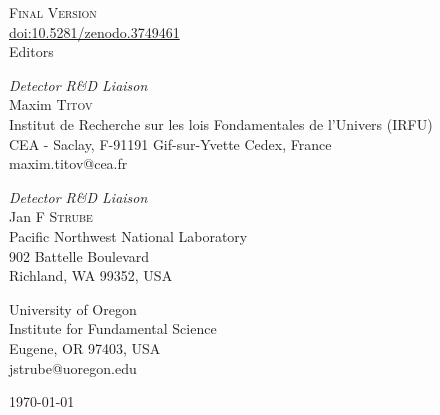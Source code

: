 \documentclass[10pt,final]{report}
\begin{document}
\begin{titlepage}
    \textsc{\Large Final Version}\\[0.5cm] %
	\href{https://doi.org/10.5281/zenodo.3749461}{doi:10.5281/zenodo.3749461}\\[1cm]
	\vfill\vfill
	{\large Editors\\}
	\begin{minipage}[t]{0.49\textwidth}
		\begin{flushleft}
			\large
			\textit{Detector R\&D Liaison}\\
			Maxim \textsc{Titov} \\
			Institut de Recherche sur les lois Fondamentales de l'Univers (IRFU) \\
			CEA - Saclay, F-91191 Gif-sur-Yvette Cedex, France\\
			maxim.titov@cea.fr
		\end{flushleft}
	\end{minipage}\hfill
	\begin{minipage}[t]{0.49\textwidth}
		\begin{flushright}
			\large
			\textit{Detector R\&D Liaison}\\
			Jan F \textsc{Strube} \\
			Pacific Northwest National Laboratory \\
			902 Battelle Boulevard \\
			Richland, WA 99352, USA \\
		\end{flushright}
			\begin{flushright}
				\large
			University of Oregon \\
			Institute for Fundamental Science \\
			Eugene, OR 97403, USA \\
			jstrube@uoregon.edu
			\end{flushright}
	\end{minipage}
		
	\vfill\vfill\vfill %
	{\large\today} %
	
	

\end{titlepage}
\end{document}

